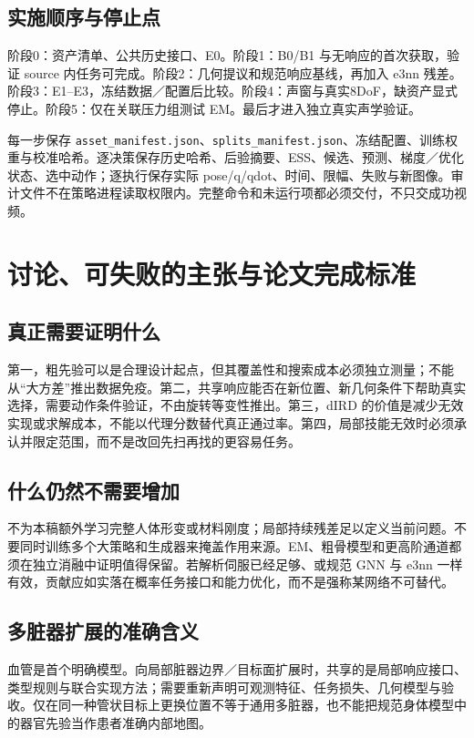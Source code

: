 \documentclass[UTF8,fontset=fandol,11pt,a4paper]{ctexart}
\theoremstyle{plain}
\theoremstyle{definition}
\theoremstyle{remark}
\numberwithin{equation}{section}
\newcommand{\code}[1]{\begingroup\small\nolinkurl{#1}\endgroup}
\begin{document}
\subsection{实施顺序与停止点}
阶段0：资产清单、公共历史接口、E0。阶段1：B0/B1 与无响应的首次获取，验证 source 内任务可完成。阶段2：几何提议和规范响应基线，再加入 e3nn 残差。阶段3：E1--E3，冻结数据／配置后比较。阶段4：声窗与真实8DoF，缺资产显式停止。阶段5：仅在关联压力组测试 EM。最后才进入独立真实声学验证。

每一步保存 \code{asset_manifest.json}、\code{splits_manifest.json}、冻结配置、训练权重与校准哈希。逐决策保存历史哈希、后验摘要、ESS、候选、预测、梯度／优化状态、选中动作；逐执行保存实际 pose/q/qdot、时间、限幅、失败与新图像。审计文件不在策略进程读取权限内。完整命令和未运行项都必须交付，不只交成功视频。

\section{讨论、可失败的主张与论文完成标准}
\label{sec:discussion}
\subsection{真正需要证明什么}
第一，粗先验可以是合理设计起点，但其覆盖性和搜索成本必须独立测量；不能从“大方差”推出数据免疫。第二，共享响应能否在新位置、新几何条件下帮助真实选择，需要动作条件验证，不由旋转等变性推出。第三，dIRD 的价值是减少无效实现或求解成本，不能以代理分数替代真正通过率。第四，局部技能无效时必须承认并限定范围，而不是改回先扫再找的更容易任务。

\subsection{什么仍然不需要增加}
不为本稿额外学习完整人体形变或材料刚度；局部持续残差足以定义当前问题。不要同时训练多个大策略和生成器来掩盖作用来源。EM、粗骨模型和更高阶通道都须在独立消融中证明值得保留。若解析伺服已经足够、或规范 GNN 与 e3nn 一样有效，贡献应如实落在概率任务接口和能力优化，而不是强称某网络不可替代。

\subsection{多脏器扩展的准确含义}
血管是首个明确模型。向局部脏器边界／目标面扩展时，共享的是局部响应接口、类型规则与联合实现方法；需要重新声明可观测特征、任务损失、几何模型与验收。仅在同一种管状目标上更换位置不等于通用多脏器，也不能把规范身体模型中的器官先验当作患者准确内部地图。
\end{document}
